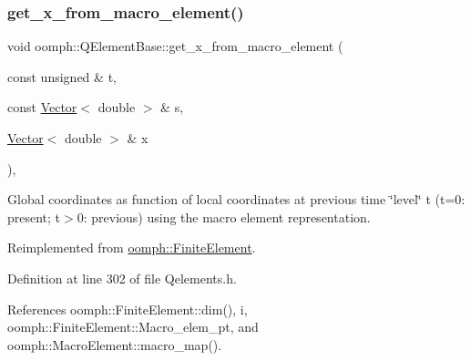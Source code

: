 \mbox{\label{classoomph_1_1QElementBase_a61b722ea5221157266b894bdbb255011}} 
\subsubsection{\texorpdfstring{get\+\_\+x\+\_\+from\+\_\+macro\+\_\+element()}{get\_x\_from\_macro\_element()}\hspace{0.1cm}{\footnotesize\ttfamily [2/2]}}
{\footnotesize\ttfamily void oomph\+::\+Q\+Element\+Base\+::get\+\_\+x\+\_\+from\+\_\+macro\+\_\+element (\begin{DoxyParamCaption}\item[{const unsigned \&}]{t,  }\item[{const \hyperlink{classoomph_1_1Vector}{Vector}$<$ double $>$ \&}]{s,  }\item[{\hyperlink{classoomph_1_1Vector}{Vector}$<$ double $>$ \&}]{x }\end{DoxyParamCaption})\hspace{0.3cm}{\ttfamily [inline]}, {\ttfamily [virtual]}}



Global coordinates as function of local coordinates at previous time \char`\"{}level\char`\"{} t (t=0\+: present; t$>$0\+: previous) using the macro element representation. 



Reimplemented from \hyperlink{classoomph_1_1FiniteElement_ac14a15f09e036608d889e3ab232760d4}{oomph\+::\+Finite\+Element}.



Definition at line 302 of file Qelements.\+h.



References oomph\+::\+Finite\+Element\+::dim(), i, oomph\+::\+Finite\+Element\+::\+Macro\+\_\+elem\+\_\+pt, and oomph\+::\+Macro\+Element\+::macro\+\_\+map().

\mbox{\label{classoomph_1_1QElementBase_a3899ee1cbbe7b89bde7232b437a0a65c}} 
